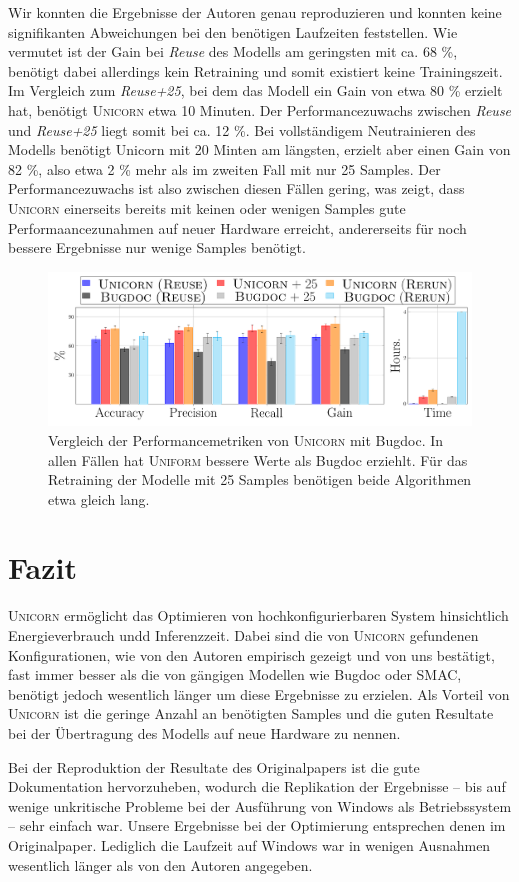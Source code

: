 \documentclass[11pt]{article}
\begin{document}
Wir konnten die Ergebnisse der Autoren genau reproduzieren und konnten keine signifikanten Abweichungen bei den benötigen Laufzeiten feststellen. Wie vermutet ist der Gain bei \textit{Reuse} des Modells am geringsten mit ca. 68 \%, benötigt dabei allerdings kein Retraining und somit existiert keine Trainingszeit. Im Vergleich zum \textit{Reuse+25}, bei dem das Modell ein Gain von etwa 80 \% erzielt hat, benötigt \textsc{Unicorn} etwa 10 Minuten. Der Performancezuwachs zwischen \textit{Reuse} und \textit{Reuse+25} liegt somit bei ca. 12 \%. Bei vollständigem Neutrainieren des Modells benötigt Unicorn mit 20 Minten am längsten, erzielt aber einen Gain von 82 \%, also etwa 2 \% mehr als im zweiten Fall mit nur 25 Samples. Der Performancezuwachs ist also zwischen diesen Fällen gering, was zeigt, dass \textsc{Unicorn} einerseits bereits mit keinen oder wenigen Samples gute Performaancezunahmen auf neuer Hardware erreicht, andererseits für noch bessere Ergebnisse nur wenige Samples benötigt.

\begin{figure}[!htbp]
  \centering
  \includegraphics[width=\linewidth]{./img/barplot_multi_debug_orig.pdf}
  \caption{Vergleich der Performancemetriken von \textsc{Unicorn} mit Bugdoc. In allen Fällen hat \textsc{Uniform} bessere Werte als Bugdoc erziehlt. Für das Retraining der Modelle mit 25 Samples benötigen beide Algorithmen etwa gleich lang.}

  \label{fig:2}
\end{figure}

\section*{Fazit}

\textsc{Unicorn} ermöglicht das Optimieren von hochkonfigurierbaren System hinsichtlich Energieverbrauch undd Inferenzzeit. Dabei sind die von \textsc{Unicorn} gefundenen Konfigurationen, wie von den Autoren empirisch gezeigt und von uns bestätigt, fast immer besser als die von gängigen Modellen wie Bugdoc oder SMAC, benötigt jedoch wesentlich länger um diese Ergebnisse zu erzielen. Als Vorteil von \textsc{Unicorn} ist die geringe Anzahl an benötigten Samples und die guten Resultate bei der Übertragung des Modells auf neue Hardware zu nennen.

Bei der Reproduktion der Resultate des Originalpapers ist die gute Dokumentation hervorzuheben, wodurch die Replikation der Ergebnisse -- bis auf wenige unkritische Probleme bei der Ausführung von Windows als Betriebssystem -- sehr einfach war. Unsere Ergebnisse bei der Optimierung entsprechen denen im Originalpaper. Lediglich die Laufzeit auf Windows war in wenigen Ausnahmen wesentlich länger als von den Autoren angegeben.
\end{document}
